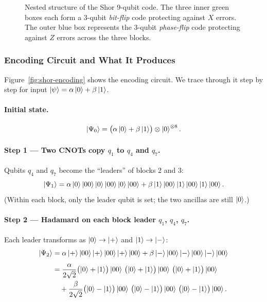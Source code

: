 \documentclass[11pt, a4paper]{article}
\theoremstyle{definition}
\theoremstyle{plain}
\theoremstyle{remark}
\newcommand{\code}[1]{[\![#1]\!]}
\begin{document}
\begin{figure}[H]
\caption{Nested structure of the Shor 9-qubit code.  The three inner green
boxes each form a 3-qubit \emph{bit-flip} code protecting against $X$ errors.
The outer blue box represents the 3-qubit \emph{phase-flip} code protecting
against $Z$ errors across the three blocks.}
\label{fig:shor-structure}
\end{figure}

\subsubsection{Encoding Circuit and What It Produces}
\label{sec:shor-circuit}

Figure~\ref{fig:shor-encoding} shows the encoding circuit.
We trace through it step by step for input
$\ket{\psi} = \alpha\ket{0}+\beta\ket{1}$.

\paragraph{Initial state.}
\[
  \ket{\Psi_0}
  = \bigl(\alpha\ket{0}+\beta\ket{1}\bigr)
    \otimes\ket{0}^{\otimes 8}.
\]

\paragraph{Step 1 --- Two CNOTs copy $q_1$ to $q_4$ and $q_7$.}
Qubits $q_4$ and $q_7$ become the ``leaders'' of blocks 2 and 3:
\[
  \ket{\Psi_1}
  = \alpha\ket{0}\ket{00}\ket{0}\ket{00}\ket{0}\ket{00}
  + \beta\ket{1}\ket{00}\ket{1}\ket{00}\ket{1}\ket{00}.
\]
(Within each block, only the leader qubit is set; the two ancillas are
still $\ket{0}$.)

\paragraph{Step 2 --- Hadamard on each block leader $q_1$, $q_4$, $q_7$.}
Each leader transforms as $\ket{0}\to\ket{+}$ and $\ket{1}\to\ket{-}$:
\begin{align*}
  \ket{\Psi_2}
  &= \alpha\ket{+}\ket{00}\ket{+}\ket{00}\ket{+}\ket{00}
   + \beta\ket{-}\ket{00}\ket{-}\ket{00}\ket{-}\ket{00}\\[4pt]
  &= \frac{\alpha}{2\sqrt{2}}
    \bigl(\ket{0}+\ket{1}\bigr)\ket{00}\,
    \bigl(\ket{0}+\ket{1}\bigr)\ket{00}\,
    \bigl(\ket{0}+\ket{1}\bigr)\ket{00}\\
  &\quad+\frac{\beta}{2\sqrt{2}}
    \bigl(\ket{0}-\ket{1}\bigr)\ket{00}\,
    \bigl(\ket{0}-\ket{1}\bigr)\ket{00}\,
    \bigl(\ket{0}-\ket{1}\bigr)\ket{00}.
\end{align*}
\end{document}
